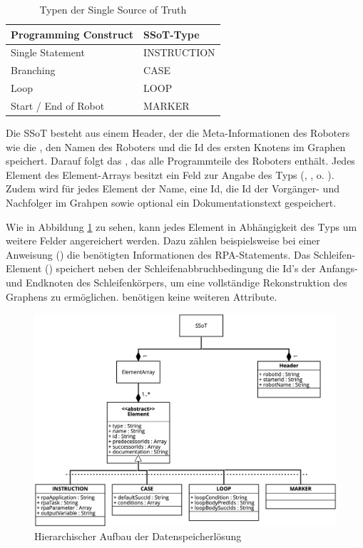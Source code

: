 \begin{table}[h!]
    \caption{Typen der Single Source of Truth}
    \centering
        \begin{tabular}{|l|l|}
        \hline
        \textbf{Programming Construct} & \textbf{SSoT-Type} \\ \hline
        Single Statement               & INSTRUCTION       \\ \hline
        Branching                      & CASE              \\ \hline
        Loop                           & LOOP              \\ \hline
        Start / End of Robot           & MARKER            \\ \hline
        \end{tabular}
    \label{tab:ssot-types}
\end{table}

Die SSoT besteht aus einem Header, der die Meta-Informationen des Roboters wie die , den Namen des Roboters und die Id des ersten Knotens im Graphen speichert. Darauf folgt das , das alle Programmteile des Roboters enthält.  Jedes Element des Element-Arrays besitzt ein Feld zur Angabe des Typs (, ,  o. ). Zudem wird für jedes Element der Name, eine Id, die Id der Vorgänger- und Nachfolger im Grahpen  sowie optional ein Dokumentationstext gespeichert. 

Wie in Abbildung \ref{fig:aufbauSSOT} zu sehen, kann jedes Element in Abhängigkeit des Typs um weitere Felder angereichert werden. Dazu zählen beispielsweise bei einer Anweisung () die benötigten Informationen des RPA-Statements. Das Schleifen-Element () speichert neben der Schleifenabbruchbedingung die Id’s der Anfangs- und Endknoten des Schleifenkörpers, um eine vollständige Rekonstruktion des Graphens zu ermöglichen.  benötigen keine weiteren Attribute.

\begin{figure}[h!]
    \centering
    \includegraphics[width=1\textwidth]{Bachelorarbeit/images/aufbauSSOT2.png}
    \caption{Hierarchischer Aufbau der Datenspeicherlösung}
    \label{fig:aufbauSSOT}
\end{figure}

